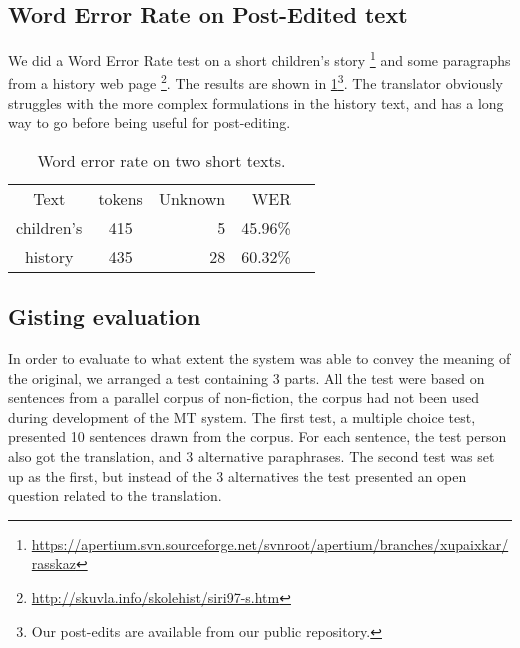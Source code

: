 \subsection{Word Error Rate on Post-Edited text}
\label{sec:WER}
We did a Word Error Rate test on a short children's story
\footnote{\href{https://apertium.svn.sourceforge.net/svnroot/apertium/branches/xupaixkar/rasskaz}{https://apertium.svn.sourceforge.net/svnroot/apertium/branches/xupaixkar/rasskaz}}
and some paragraphs from a history web page
\footnote{\href{http://skuvla.info/skolehist/siri97-s.htm}{http://skuvla.info/skolehist/siri97-s.htm}}.
The results are shown in \ref{table:wer}\footnote{Our post-edits are
  available from our public repository.}. The translator obviously
struggles with the more complex formulations in the history text, and
has a long way to go before being useful for post-editing.


\begin{table}
  \begin{center}
  \begin{tabular}{ccrrr}
   Text       & tokens & Unknown & WER  \\
   children's & 415     & 5      & 45.96\% \\
   history    & 435     & 28     & 60.32\%  \\
  \end{tabular}
    \caption{Word error rate on two short texts.}
    \label{table:wer}
  \end{center}
\end{table}


\subsection{Gisting evaluation}
  
In order to evaluate to what extent the system was able to convey the
meaning of the original, we arranged a test containing 3 parts. All
the test were based on sentences from a parallel corpus of
non-fiction, the corpus had not been used during development of the MT
system. The first test, a multiple choice test, presented 10 sentences
drawn from the corpus. For each sentence, the test person also got the
translation, and 3 alternative paraphrases. The second test was set up
as the first, but instead of the 3 alternatives the test presented an
open question related to the translation.

